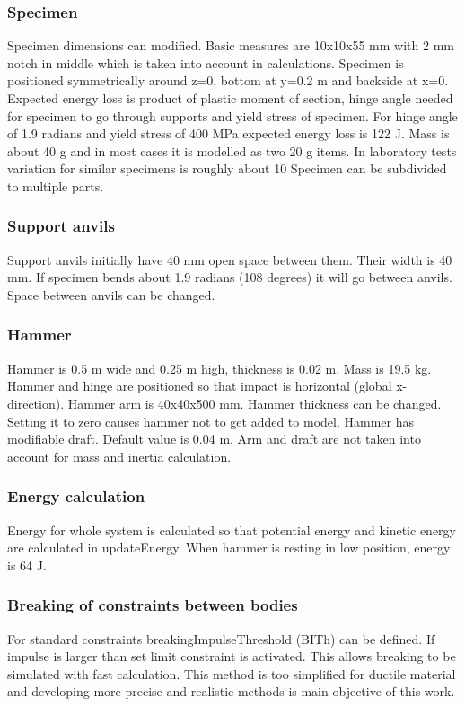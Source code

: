 \subsubsection{Specimen}
Specimen dimensions can modified. Basic measures are 10x10x55 mm with 2 mm notch in middle which is taken into account in calculations. Specimen is positioned symmetrically around z=0, bottom at y=0.2 m and backside at x=0. 
Expected energy loss is product of plastic moment of section, hinge angle needed for specimen to go through supports and 
yield stress of specimen. For hinge angle of 1.9 radians and yield stress of 400 MPa expected energy 
loss is 122 J. Mass is about 40 g and in most cases it is modelled as two 20 g items. In laboratory tests variation for similar 
specimens is roughly about 10 %
Specimen can be subdivided to multiple parts.

\subsubsection{Support anvils}
Support anvils initially have 40 mm open space between them. Their width is 40 mm. 
If specimen bends about 1.9 radians (108 degrees) it will go between anvils. Space between anvils can be changed.

\subsubsection{Hammer}
Hammer is 0.5 m wide and 0.25 m high, thickness is 0.02 m. Mass is 19.5 kg. Hammer and hinge are positioned so that 
impact is horizontal  (global x-direction). Hammer arm is 40x40x500 mm. Hammer thickness can be changed.
Setting it to zero causes hammer not to get added to model. Hammer has modifiable draft. Default value is 0.04 m. 
Arm and draft are not taken into account for mass and inertia calculation.

\subsubsection{Energy calculation}

Energy for whole system is calculated so that potential energy and kinetic energy are calculated in updateEnergy. 
When hammer is resting in low position, energy is 64 J. 

\subsubsection{Breaking of constraints between bodies}
For standard \cbullet constraints breakingImpulseThreshold (BITh) can be defined. If impulse is larger than set limit constraint is activated. 
This allows breaking to be simulated with fast calculation. 
This method is too simplified for ductile material and developing more precise and realistic methods is main objective of this work.  

